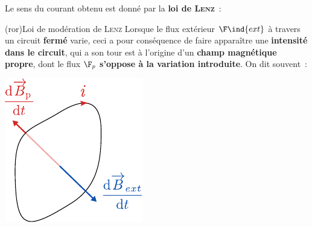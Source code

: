 \documentclass[../../main/main.tex]{subfiles}
\begin{document}
Le sens du courant obtenu est donné par la \textbf{loi de \textsc{Lenz}}~:
\begin{tcb*}[sidebyside, righthand ratio=.25](ror){Loi de modération de \textsc{Lenz}}
	Lorsque le flux extérieur $\F\ind{ext}$ à travers un circuit \textbf{fermé}
	varie, ceci a pour conséquence de faire apparaître une \textbf{intensité dans
		le circuit}, qui a son tour est à l'origine d'un \textbf{champ magnétique
		propre}, dont le flux $\F_p$ \textbf{s'oppose à la variation introduite}. On
	dit souvent~:
	\begin{center}
	\end{center}
	\tcblower
	\begin{center}
		\includegraphics[width=\linewidth]{lenz_prop}
	\end{center}
\end{tcb*}
\end{document}
